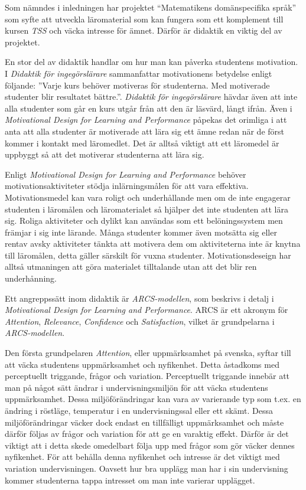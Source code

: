 \documentclass[]{article}
\begin{document}
Som nämndes i inledningen har projektet “Matematikens domänspecifika språk” som syfte att utveckla 
läromaterial som kan fungera som ett komplement till kursen \textit{TSS} och väcka intresse för ämnet. 
Därför är didaktik en viktig del av projektet.

En stor del av didaktik handlar om hur man kan påverka studentens motivation. I \textit{Didaktik för 
ingegörslärare} sammanfattar motivationens betydelse enligt följande: ”Varje kurs behöver motiveras 
för studenterna. Med motiverade studenter blir resultatet bättre.”. \textit{Didaktik för ingegörslärare} 
hävdar även att inte alla studenter som går en kurs utgår från att den är läsvärd, långt ifrån. Även i 
\textit{Motivational Design for Learning and Performance} påpekas det orimliga i att anta att alla studenter är 
motiverade att lära sig ett ämne redan när de först kommer i kontakt med läromedlet. Det är alltså 
viktigt att ett läromedel är uppbyggt så att det motiverar studenterna att lära sig.

Enligt \textit{Motivational Design for Learning and Performance} behöver motivationsaktiviteter stödja 
inlärningsmålen för att vara effektiva. Motivationsmedel kan vara roligt och underhållande men om de 
inte engagerar studenten i läromålen och läromaterialet så hjälper det inte studenten att lära sig. 
Roliga aktiviteter och dylikt kan användas som ett belöningssystem men främjar i sig inte lärande. Många 
studenter kommer även motsätta sig eller rentav avsky aktiviteter tänkta att motivera dem om 
aktiviteterna inte är knytna till läromålen, detta gäller särskilt för vuxna studenter. 
Motivationsdeseign har alltså utmaningen att göra materialet tilltalande utan att det blir ren 
underhånning.

Ett angreppssätt inom didaktik är \textit{ARCS-modellen}, som beskrivs i detalj i \textit{Motivational 
Design for Learning and Performance}. ARCS är ett akronym för \textit{Attention}, \textit{Relevance}, 
\textit{Confidence} och \textit{Satisfaction}, vilket är grundpelarna i \textit{ARCS-modellen}. 

Den första grundpelaren \textit{Attention}, eller uppmärksamhet på svenska, syftar till att väcka studentens 
uppmärksamhet och nyfikenhet. Detta åstadkoms med perceptuellt triggande, frågor och variation. 
Perceptuellt triggande innebär att man på något sätt ändrar i undervisningsmiljön för att väcka 
studentens uppmärksamhet. Dessa miljöförändringar kan vara av varierande typ som t.ex. en ändring i 
röstläge, temperatur i en undervisningssal eller ett skämt. Dessa miljöförändringar väcker dock endast 
en tillfälligt uppmärksamhet och måste därför följas av frågor och variation för att ge en varaktig 
effekt. Därför är det viktigt att i detta skede omedelbart följa upp med frågor som gör väcker dennes 
nyfikenhet. För att behålla denna nyfikenhet och intresse är det viktigt med variation undervisningen. 
Oavsett hur bra upplägg man har i sin undervisning kommer studenterna tappa intresset om man inte 
varierar upplägget.
\end{document}

